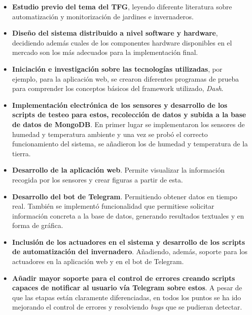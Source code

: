\documentclass[a4paper, 12pt, oneside]{book}
\begin{document}
\begin{itemize}
\item \textbf{Estudio previo del tema del TFG}, leyendo diferente literatura sobre automatización y monitorización de jardines e invernaderos.

\item \textbf{Diseño del sistema distribuido a nivel software y hardware}, decidiendo además cuales de los componentes hardware disponibles en el mercado son los más adecuados para la implementación final.

\item \textbf{Iniciación e investigación sobre las tecnologías utilizadas}, por ejemplo, para la aplicación web, se crearon diferentes programas de prueba para comprender los conceptos básicos del framework utilizado, \textit{Dash}.

\item \textbf{Implementación electrónica de los sensores y desarrollo de los scripts de testeo para estos, recolección de datos y subida a la base de datos de MongoDB}. En primer lugar se implementaron los sensores de humedad y temperatura ambiente y una vez se probó el correcto funcionamiento del sistema, se añadieron los de humedad y temperatura de la tierra.

\item \textbf{Desarrollo de la aplicación web}. Permite visualizar la información recogida por los sensores y crear figuras a partir de esta.

\item \textbf{Desarrollo del bot de Telegram}. Permitiendo obtener datos en tiempo real. También se implementó funcionalidad que permitiese solicitar información concreta a la base de datos, generando resultados textuales y en forma de gráfica.

\item \textbf{Inclusión de los actuadores en el sistema y desarrollo de los scripts de automatización del invernadero}. Añadiendo, además, soporte para los actuadores en la aplicación web y en el bot de Telegram.

\item \textbf{Añadir mayor soporte para el control de errores creando scripts capaces de notificar al usuario vía Telegram sobre estos}. A pesar de que las etapas están claramente diferenciadas, en todos los puntos se ha ido mejorando el control de errores y resolviendo \textit{bugs} que se pudieran detectar. 

\end{itemize}
  
\end{document}
